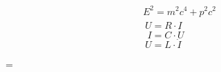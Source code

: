 

\begin{frame}
    \huge
    \begin{align*}
        E^2 = m^2c^4 + p^2c^2
    \end{align*}
    $$\phantom{I}U=R \cdot I       \phantom{C \cdot \dot{U} L \cdot \dot{I}}$$
    $$\phantom{U}I=C \cdot \dot{U} \phantom{R \cdot I       L \cdot \dot{I}}$$
    $$\phantom{I}U=L \cdot \dot{I} \phantom{C \cdot \dot{U} R \cdot I      }$$
\end{frame}

\phantom{UI}=